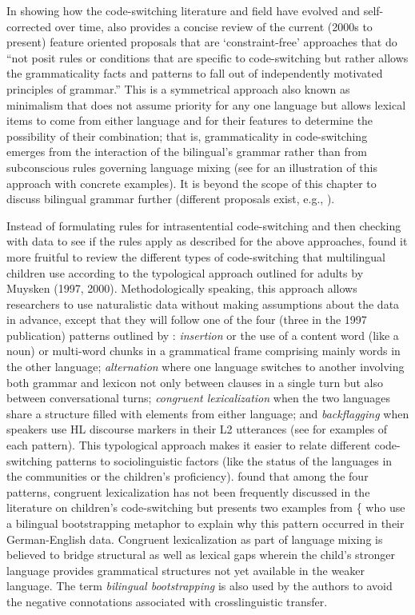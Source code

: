 \documentclass[output=paper,colorlinks,citecolor=brown]{langscibook}
\begin{document}
In showing how the code-switching literature and field have evolved and self-corrected over time, \citet[20]{MacSwan2019} also provides a concise review of the current (2000s to present) feature oriented proposals that are ‘constraint-free’ approaches that do “not posit rules or conditions that are specific to code-switching but rather allows the grammaticality facts and patterns to fall out of independently motivated principles of grammar.”  This is a symmetrical approach also known as minimalism that does not assume priority for any one language but allows lexical items to come from either language and for their features to determine the possibility of their combination; that is, grammaticality in code-switching emerges from the interaction of the bilingual’s grammar rather than from subconscious rules governing language mixing (see \citealt{Deuchar2013} for an illustration of this approach with concrete examples). It is beyond the scope of this chapter to discuss bilingual grammar further (different proposals exist, e.g., \citealt{Lopez2020, MacSwan2022}). 

Instead of formulating rules for intrasentential code-switching and then checking with data to see if the rules apply as described for the above approaches, \citet{Treffers-Daller2022} found it more fruitful to review the different types of code-switching that multilingual children use according to the typological approach outlined for adults by Muysken (1997, 2000). Methodologically speaking, this approach allows researchers to use naturalistic data without making assumptions about the data in advance, except that they will follow one of the four (three in the 1997 publication) patterns outlined by \citet{Muysken2000}:  \textit{insertion} or the use of a content word (like a noun) or multi-word chunks in a grammatical frame comprising mainly words in the other language;  \textit{alternation} where one language switches to another involving both grammar and lexicon not only between clauses in a single turn but also between conversational turns;  \textit{congruent lexicalization} when the two languages share a structure  filled with elements from either language; and  \textit{backflagging} when speakers use HL discourse markers in their L2 utterances (see \citealt{Treffers-Daller2022} for examples of each pattern). This typological approach makes it easier to relate different code-switching patterns to sociolinguistic factors (like the status of the languages in the communities or the children’s proficiency). \citet{Treffers-Daller2022} found that among the four patterns, congruent lexicalization has not been frequently discussed in the literature on children’s code-switching but presents two examples from \{\citet{Gawlitzek-MaiwaldTracy1996} who use a bilingual bootstrapping metaphor to explain why this pattern occurred in their German-English data. Congruent lexicalization as part of language mixing is believed to bridge structural as well as lexical gaps wherein the child’s stronger language provides grammatical structures not yet available in the weaker language.  The term \textit{bilingual bootstrapping} is also used by the authors to avoid the negative connotations associated with crosslinguistic transfer.
\end{document}
